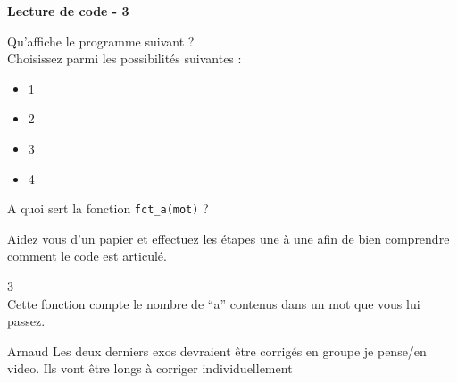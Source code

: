 	\begin{Exercice}[5 minutes] \textbf{Lecture de code - 3 \optionnel} 
	
	Qu'affiche le programme suivant ? \\ 
	
	  
	
	Choisissez parmi les possibilités suivantes :
	
	\begin{itemize}
	\item 1 \\
	\item 2 \\
	\item 3 \\
	\item 4 \\
	\end{itemize}
	
	A quoi sert la fonction \lstinline{fct_a(mot)} ? \\
	
		\begin{conseil} 
		Aidez vous d'un papier et effectuez les étapes une à une afin de bien comprendre comment le code est articulé.
		\end{conseil} 
	
		\begin{solution} 
		3 \\
		
		Cette fonction compte le nombre de ``a'' contenus dans un mot que vous lui passez.
	
		\end{solution} 
	
	\end{Exercice}
	
	\begin{note}{Arnaud}
		Les deux derniers exos devraient être corrigés en groupe je pense/en video. Ils vont être longs à corriger individuellement
	\end{note}
	
